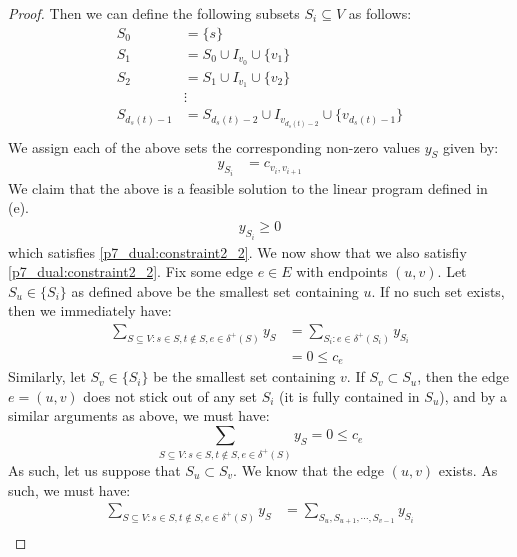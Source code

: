 \documentclass[12pt]{exam}
\begin{document}
\begin{questions}
\begin{solution}
\begin{enumerate}[label=(\alph*)]
\begin{proof}
        Then we can define the following subsets $S_i \subseteq V$ as follows:
        \begin{align*}
          S_0 &= \{ s \} \\
          S_1 &= S_0 \cup I_{v_0}  \cup \{ v_1 \} \\
          S_2 &= S_1 \cup I_{v_1} \cup \{ v_2 \} \\
          & \vdots  \\
          S_{d_s(t) - 1} &= S_{d_s(t)-2} \cup I_{v_{d_s(t) - 2}} \cup \{v_{d_s(t) - 1}\}  \\
        \end{align*}
        We assign each of the above sets the corresponding non-zero values $y_S$ given by:
        \begin{align*}
          y_{S_i} &= c_{v_i, v_{i+1}} \tag{The cost of the edge along our s-t path that sticks out of $S_i$}
        \end{align*}
        We claim that the above is a feasible solution to the linear program defined in (e).
        \begin{align*}
          y_{S_i} \geq 0 \tag{Edge costs are non-negative}
        \end{align*}
        which satisfies \ref{p7_dual:constraint2_2}. We now show that we also satisfiy \ref{p7_dual:constraint2_2}. Fix some edge $e \in E$ with endpoints $(u,v)$. Let $S_u \in \{ S_i \}$ as defined above be the smallest set containing $u$. If no such set exists, then we immediately have:
        \begin{align*}
          \sum_{S \subseteq V: s \in S, t \notin S, e \in \delta^+(S)} y_S &= \sum_{S_i: e \in \delta^+(S_i)} y_{S_i} \tag{Only non-zero values} \\
          &= 0 \leq c_e \tag{Since $u \notin S_i$ for all $i$}
        \end{align*}
        Similarly, let $S_v \in \{S_i\}$ be the smallest set containing $v$. If $S_v \subset S_u$, then the edge $e = (u,v)$ does not stick out of any set $S_i$ (it is fully contained in $S_u$), and by a similar arguments as above, we must have:
        \[
          \sum_{S \subseteq V: s \in S, t \notin S, e \in \delta^+(S)} y_S = 0 \leq c_e
        \]
        As such, let us suppose that $S_u \subset S_v$. We know that the edge $(u,v)$ exists. As such, we must have:
        \begin{align*}
            \sum_{S \subseteq V: s \in S, t \notin S, e \in \delta^+(S)} y_S &= \sum_{S_u, S_{u+1}, \cdots, S_{v-1}} y_{S_i} \tag{Sum over only sets until $v$ is added} \\

\end{align*}
\end{proof}
\end{enumerate}
\end{solution}
\end{questions}
\end{document}
